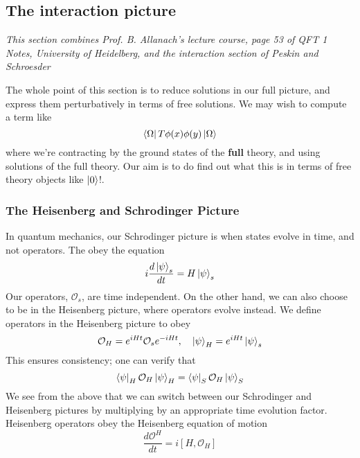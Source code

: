 \subsection{The interaction picture} 
\textit{This section combines Prof. B. Allanach's lecture course, 
page 53 of QFT 1 Notes, University of Heidelberg, and the interaction section 
of Peskin and Schroesder}


The whole point of this section is to reduce 
solutions in our full picture, and
express them perturbatively in terms of free solutions. 
We may wish to compute a term like 
\[
\bra{ \Omega } T \phi ( x) \phi ( y ) \ket{ \Omega } 
\] where we're contracting by the ground states of the 
\textbf{full} theory, and using solutions of the full theory. Our aim is to do find out what this is in terms of free theory objects like $ \ket{ 0 } $!. 

\subsubsection{The Heisenberg and Schrodinger Picture} 
In quantum mechanics, our Schrodinger picture is when states evolve in time, and not operators. 
The obey the equation 
\[
i \frac{ d \ket{ \psi }_ s }{ d t} = H \ket{ \psi } _ s  
\] Our operators, $ \mathcal{ O } _s $, are time independent. 
On the other hand, we can also choose to be in the Heisenberg picture, 
where operators evolve instead. We define operators in the 
Heisenberg picture to obey 
\[
\mathcal{ O }_ H = e^{ i H t } \mathcal{ O  }_ s e^{  - i H t}, \quad  \ket{ \psi } _ H = e^{ i H t } \ket{ \psi }_ s  \] This ensures consistency; one can verify that 
\[
\bra{ \psi }_H \mathcal{ O } _ H \ket{ \psi } _ H =    \bra{ \psi }_S \mathcal{ O } _ H \ket{ \psi } _ S   
\] We see from the above that we can switch between our Schrodinger and Heisenberg pictures by multiplying by an appropriate time evolution factor. Heisenberg operators obey the Heisenberg equation of motion
\[
\frac{ d \mathcal{ O}^H  }{dt } = i [ H, \mathcal{ O }_H ] 
\] 

